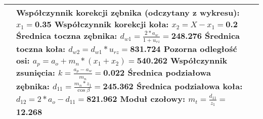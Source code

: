 \documentclass{article}%
\begin{document}
\begin{longtable}{|p{3cm}|p{7cm}|p{3cm}|}
& \newline  \newline Współczynnik korekcji zębnika (odczytany z wykresu): \newline$x_1 = $0.35  \newline \newline Współczynnik korekcji koła: \newline $x_2 = X - x_1 = $0.2  \newline \newline Średnica toczna zębnika: \newline $d_{w1} = \frac{2*a_w}{1 + u_{rz}} = $248.276  \newline \newline Średnica toczna koła: \newline $d_{w2} = d_{w1} * u_{rz} = $831.724  \newline \newline Pozorna odległość osi: \newline $a_p = a_o + m_n * (x_1 + x_2) = $540.262  \newline \newline Współczynnik zsunięcia: \newline$k = \frac{a_p - a_w}{m_n} = $0.022  \newline \newline Średnica podziałowa zębnika: \newline$d_{11} = \frac{m_n * z_1}{\cos{\beta}} = $245.362  \newline \newline Średnica podziałowa koła: \newline$d_{12} = 2 * a_o - d_{11} = $821.962  \newline \newline Moduł czołowy: \newline $m_t = \frac{d_{11}}{z_1} = $12.268&\\%
\hline%
\end{longtable}

%
\end{document}
